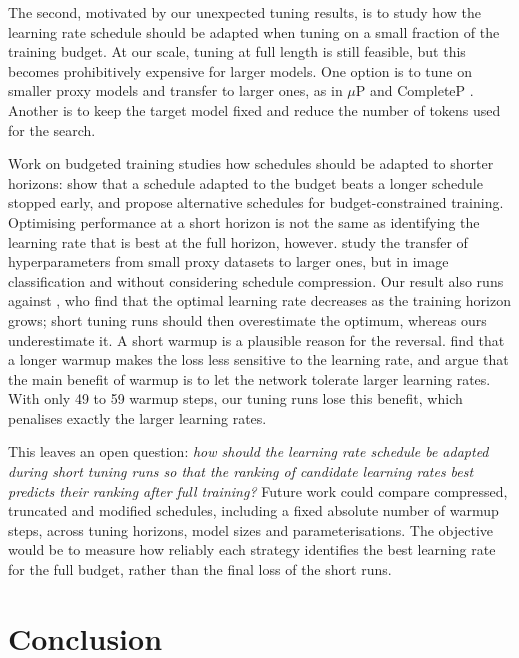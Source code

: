 \documentclass[10pt,twocolumn,a4paper]{article}
\begin{document}
The second, motivated by our unexpected tuning results, is to study how the learning rate schedule should be adapted when tuning on a small fraction of the training budget. At our scale, tuning at full length is still feasible, but this becomes prohibitively expensive for larger models. One option is to tune on smaller proxy models and transfer to larger ones, as in $\mu$P \citep{yang2021feature,yang2022tensor} and CompleteP \citep{dey2025completep}. Another is to keep the target model fixed and reduce the number of tokens used for the search.

Work on budgeted training studies how schedules should be adapted to shorter horizons: \citet{li2020budgeted} show that a schedule adapted to the budget beats a longer schedule stopped early, and \citet{chen2022rex} propose alternative schedules for budget-constrained training. Optimising performance at a short horizon is not the same as identifying the learning rate that is best at the full horizon, however. \citet{shleifer2019using} study the transfer of hyperparameters from small proxy datasets to larger ones, but in image classification and without considering schedule compression. Our result also runs against \citet{bjorck2024scaling}, who find that the optimal learning rate decreases as the training horizon grows; short tuning runs should then overestimate the optimum, whereas ours underestimate it. A short warmup is a plausible reason for the reversal. \citet{wortsman2023smallscale} find that a longer warmup makes the loss less sensitive to the learning rate, and \citet{kalra2024warmup} argue that the main benefit of warmup is to let the network tolerate larger learning rates. With only 49 to 59 warmup steps, our tuning runs lose this benefit, which penalises exactly the larger learning rates.

This leaves an open question: \emph{how should the learning rate schedule be adapted during short tuning runs so that the ranking of candidate learning rates best predicts their ranking after full training?} Future work could compare compressed, truncated and modified schedules, including a fixed absolute number of warmup steps, across tuning horizons, model sizes and parameterisations. The objective would be to measure how reliably each strategy identifies the best learning rate for the full budget, rather than the final loss of the short runs.

\section{Conclusion}
\end{document}
